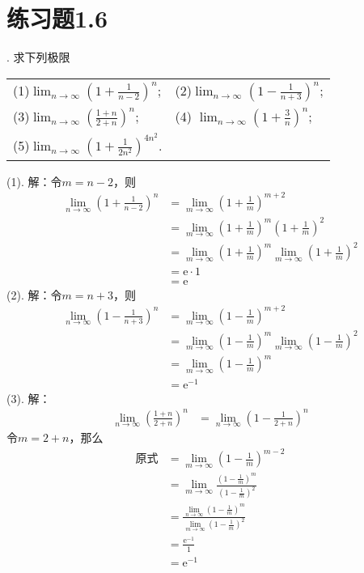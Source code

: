 \section*{练习题1.6}
. 求下列极限
\begin{table}[H]
    \centering
    \begin{tabularx}{0.8\textwidth} {  >{\raggedright\arraybackslash}X >{\raggedright\arraybackslash}X  }
       (1)$\displaystyle \lim_{n\to\infty} \left(1+\frac{1}{n-2}\right)^n$; &  (2)$\displaystyle \lim_{n \to \infty} \left(1-\frac{1}{n+3}\right)^n$; \\ [1.5em]
       (3)$\displaystyle \lim_{n \to \infty} \left(\frac{1+n}{2+n}\right)^n$; & (4) $\displaystyle \lim_{n \to \infty} \left(1+\frac{3}{n}\right)^n$; \\ [1.5em]
       (5)$\displaystyle \lim_{n \to \infty} \left(1+\frac{1}{2n^2}\right)^{4n^2}$.
      \end{tabularx}
\end{table}
\noindent (1). 解：令$m = n-2$，则
\begin{align}
    \lim_{n \to \infty} \left(1+\frac{1}{n-2}\right)^n &= \lim_{m \to \infty} \left(1+ \frac{1}{m}\right)^{m+2} \\
    &= \lim_{m \to \infty} \left(1+\frac{1}{m}\right)^m \left(1+\frac{1}{m}\right)^2 \\
    &= \lim_{m \to \infty} \left(1+\frac{1}{m}\right)^m \lim_{m \to \infty} \left(1+\frac{1}{m}\right)^2 \\
    &= \mathrm{e} \cdot 1 \\
    &= \mathrm{e}
\end{align}
\noindent (2). 解：令$m=n+3$，则
\begin{align}
    \lim_{n \to \infty} \left(1-\frac{1}{n+3}\right)^n &= \lim_{m \to \infty} \left(1-\frac{1}{m}\right)^{m+2} \\
    &= \lim_{m \to \infty} \left(1-\frac{1}{m}\right)^m \lim_{m \to \infty} \left(1-\frac{1}{m}\right)^2 \\
    &= \lim_{m \to \infty} \left(1-\frac{1}{m}\right)^m \\
    &= \mathrm{e}^{-1}
\end{align}
\noindent (3). 解：
\begin{align}
    \lim_{n \to \infty} \left(\frac{1+n}{2+n}\right)^n &= \lim_{n \to \infty} \left(1 - \frac{1}{2+n}\right)^n
\end{align}
令$m = 2+n$，那么
\begin{align}
    \text{原式} &= \lim_{m \to \infty} \left(1-\frac{1}{m}\right)^{m-2} \\
    &= \lim_{m\to\infty} \frac{\left(1-\frac{1}{m}\right)^m}{\left(1-\frac{1}{m}\right)^2} \\
    &= \frac{\displaystyle\lim_{n \to \infty}\left(1-\frac{1}{m}\right)^m}{\displaystyle\lim_{m\to\infty} \left(1-\frac{1}{m}\right)^2} \\
    &= \frac{\mathrm{e}^{-1}}{1} \\
    &= \mathrm{e}^{-1}
\end{align}
